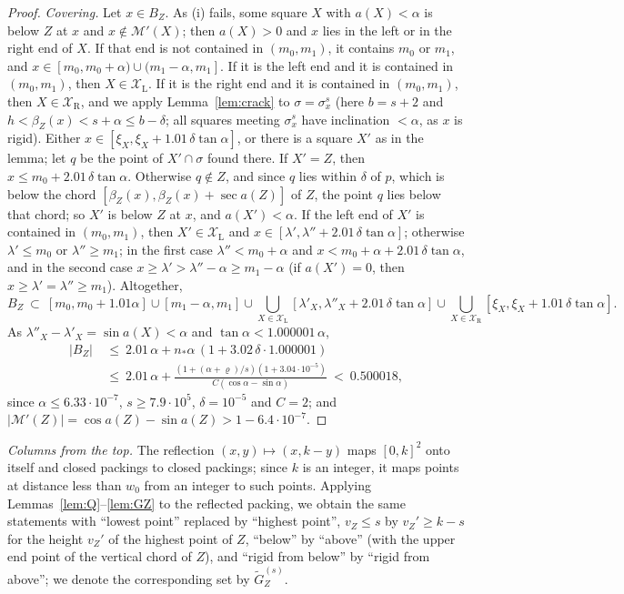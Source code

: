 \documentclass[11pt]{amsart}
\theoremstyle{definition}
\theoremstyle{remark}
\begin{document}
\begin{proof}
\emph{Covering.} Let $x\in B_Z$. As (i) fails, some square $X$ with $a(X)<\alpha$ is below $Z$ at $x$ and $x\notin\mathcal M'(X)$; then
$a(X)>0$ and $x$ lies in the left or in the right end of $X$. If that end is not contained in $(m_0,m_1)$, it contains $m_0$ or
$m_1$, and $x\in[m_0,m_0+\alpha)\cup(m_1-\alpha,m_1]$. If it is the left end and it is contained in $(m_0,m_1)$, then $X\in\mathcal X_{\mathrm L}$.
If it is the right end and it is contained in $(m_0,m_1)$, then $X\in\mathcal X_{\mathrm R}$, and we apply Lemma~\ref{lem:crack} to
$\sigma=\sigma^s_x$ (here $b=s+2$ and $h<\beta_Z(x)<s+\alpha\le b-\delta$; all squares meeting $\sigma^s_x$ have inclination $<\alpha$, as $x$ is
rigid). Either $x\in[\xi_X,\xi_X+1.01\,\delta\tan\alpha]$, or there is a square $X'$ as in the lemma; let $q$ be the point of $X'\cap\sigma$
found there. If $X'=Z$, then $x\le m_0+2.01\,\delta\tan\alpha$. Otherwise $q\notin Z$, and since $q$ lies within $\delta$ of $p$, which is below
the chord $[\beta_Z(x),\beta_Z(x)+\sec a(Z)]$ of $Z$, the point $q$ lies below that chord; so $X'$ is below $Z$ at $x$, and
$a(X')<\alpha$. If the left end of $X'$ is contained in $(m_0,m_1)$, then $X'\in\mathcal X_{\mathrm L}$ and $x\in[\lambda',\lambda''+2.01\,\delta\tan\alpha]$;
otherwise $\lambda'\le m_0$ or $\lambda''\ge m_1$; in the first case $\lambda''<m_0+\alpha$ and $x<m_0+\alpha+2.01\,\delta\tan\alpha$, and in
the second case $x\ge\lambda'>\lambda''-\alpha\ge m_1-\alpha$ (if $a(X')=0$, then $x\ge\lambda'=\lambda''\ge m_1$). Altogether,
\[
B_Z\ \subset\ [m_0,m_0+1.01\alpha]\cup[m_1-\alpha,m_1]\cup\bigcup_{X\in\mathcal X_{\mathrm L}}[\lambda'_X,\lambda''_X+2.01\,\delta\tan\alpha]\cup
\bigcup_{X\in\mathcal X_{\mathrm R}}[\xi_X,\xi_X+1.01\,\delta\tan\alpha].
\]
As $\lambda''_X-\lambda'_X=\sin a(X)<\alpha$ and $\tan\alpha<1.000001\,\alpha$,
\begin{align*}
|B_Z|\ &\le\ 2.01\,\alpha+n_*\alpha\,(1+3.02\,\delta\cdot1.000001)\\
&\le\ 2.01\,\alpha+\frac{(1+(\alpha+\varrho)/s)(1+3.04\cdot10^{-5})}{C(\cos\alpha-\sin\alpha)}\ <\ 0.500018,
\end{align*}
since $\alpha\le6.33\cdot10^{-7}$, $s\ge7.9\cdot10^5$, $\delta=10^{-5}$ and $C=2$; and $|\mathcal M'(Z)|=\cos a(Z)-\sin a(Z)>1-6.4\cdot10^{-7}$.
\end{proof}

\noindent\emph{Columns from the top.} The reflection $(x,y)\mapsto(x,k-y)$ maps $[0,k]^2$ onto itself and closed packings to closed
packings; since $k$ is an integer, it maps points at distance less than $w_0$ from an integer to such points. Applying
Lemmas~\ref{lem:Q}--\ref{lem:GZ} to the reflected packing, we obtain the same statements with ``lowest point'' replaced by
``highest point'', $v_Z\le s$ by $v_Z'\ge k-s$ for the height $v_Z'$ of the highest point of $Z$, ``below'' by ``above'' (with the upper end
point of the vertical chord of $Z$), and ``rigid from below'' by ``rigid from above''; we denote the corresponding set by
$\widetilde G_Z^{(s)}$.
\end{document}
